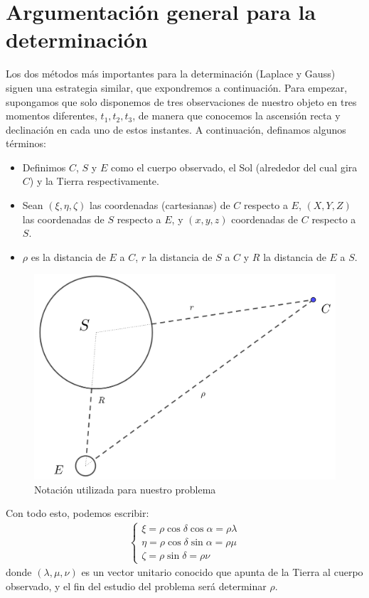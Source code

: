 \section{Argumentación general para la determinación}
Los dos métodos más importantes para la determinación (Laplace y Gauss) siguen una estrategia similar, que expondremos a continuación. Para empezar, supongamos que solo disponemos de tres observaciones de nuestro objeto en tres momentos diferentes, $t_1, t_2, t_3$, de manera que conocemos la ascensión recta y declinación en cada uno de estos instantes. A continuación, definamos algunos términos:
\begin{itemize}
\item Definimos $C$, $S$ y $E$ como el cuerpo observado, el Sol (alrededor del cual gira $C$) y la Tierra respectivamente.
\item Sean $(\xi,\eta,\zeta)$ las coordenadas (cartesianas) de $C$ respecto a $E$, $(X,Y,Z)$ las coordenadas de $S$ respecto a $E$, y $(x,y,z)$ coordenadas de $C$ respecto a $S$.
\item $\rho$ es la distancia de $E$ a $C$, $r$ la distancia de $S$ a $C$ y $R$ la distancia de $E$ a $S$.
\end{itemize}

\begin{figure}[H]
\centering
\includegraphics[scale=0.15]{images/notation.png}
\caption{Notación utilizada para nuestro problema}
\label{fig:notation}
\end{figure}

Con todo esto, podemos escribir:
\begin{align}
\left\{
\begin{array}{l}
\xi = \rho \cos{\delta}\cos{\alpha} = \rho\lambda\\
\eta = \rho \cos{\delta}\sin{\alpha} = \rho\mu\\
\zeta = \rho \sin{\delta} = \rho\nu
\end{array}
\right.
\label{eq:terminologia}
\end{align}
\noindent donde $(\lambda,\mu,\nu)$ es un vector unitario conocido que apunta de la Tierra al cuerpo observado, y el fin del estudio del problema será determinar $\rho$. \cite{moulton}\\

